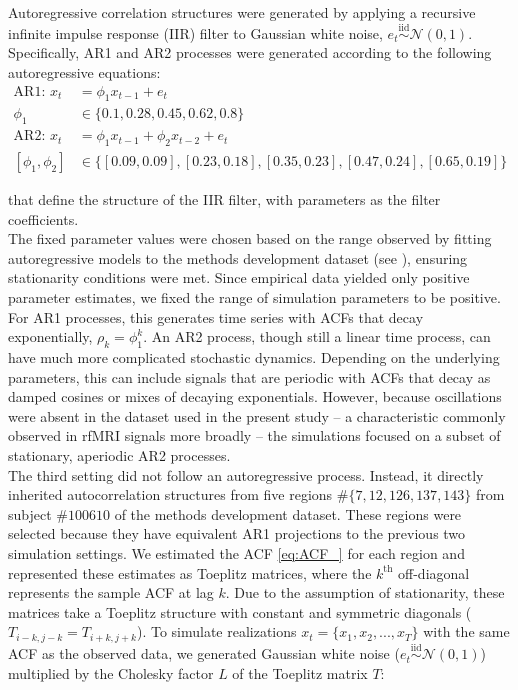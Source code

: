 \documentclass[main.tex]{subfiles}
\begin{document}
Autoregressive correlation structures were generated by applying a recursive infinite impulse response (IIR) filter to Gaussian white noise, $e_t \overset{\text{iid}}{\sim} \mathcal{N}(0, 1)$. Specifically, AR1 and AR2 processes were generated according to the following autoregressive equations:
\begin{align*}
    \text{AR1: }x_t &= \phi_1 x_{t-1} + e_t\\ 
    \phi_1 &\in \{0.1, 0.28, 0.45, 0.62, 0.8\}\\
    \text{AR2: }x_t &= \phi_1 x_{t-1} + \phi_2 x_{t-2} + e_t\\
    [\phi_1, \phi_2] &\in \{[0.09, 0.09], [0.23, 0.18], [0.35, 0.23], [0.47, 0.24], [0.65, 0.19]\}
\end{align*}

\noindent that define the structure of the IIR filter, with parameters as the filter coefficients. \\

The fixed parameter values were chosen based on the range observed by fitting autoregressive models to the methods development dataset (see ), ensuring stationarity conditions were met. Since empirical data yielded only positive parameter estimates, we fixed the range of simulation parameters to be positive. For AR1 processes, this generates time series with ACFs that decay exponentially, $\rho_k = \phi_1^k$. An AR2 process, though still a linear time process, can have much more complicated stochastic dynamics. Depending on the underlying parameters, this can include signals that are periodic with ACFs that decay as damped cosines or mixes of decaying exponentials. However, because oscillations were absent in the dataset used in the present study -- a characteristic commonly observed in rfMRI signals more broadly \citep{he_scale-free_2011} -- the simulations focused on a subset of stationary, aperiodic AR2 processes.\\

The third setting did not follow an autoregressive process. Instead, it directly inherited autocorrelation structures from five regions $\# \{7, 12, 126, 137, 143\}$ from subject $\#100610$ of the methods development dataset. These regions were selected because they have equivalent AR1 projections to the previous two simulation settings. We estimated the ACF \eqref{eq:ACF_} for each region and represented these estimates as Toeplitz matrices, where the $k^{\text{th}}$ off-diagonal represents the sample ACF at lag $k$. Due to the assumption of stationarity, these matrices take a Toeplitz structure with constant and symmetric diagonals ($T_{i-k, j-k} = T_{i+k, j+k}$). To simulate realizations $x_t = \{x_1, x_2, ..., x_T\}$ with the same ACF as the observed data, we generated Gaussian white noise ($e_t \overset{\text{iid}}{\sim} \mathcal{N}(0, 1)$) multiplied by the Cholesky factor $L$ of the Toeplitz matrix $T$:
\end{document}
